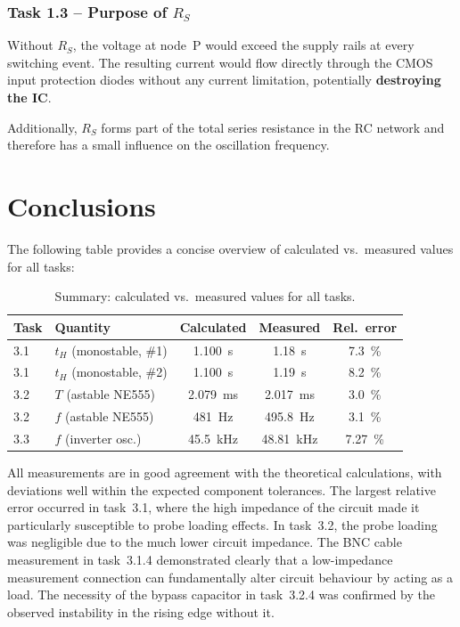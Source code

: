 \documentclass[12pt, a4paper]{article}
\begin{document}
\subsubsection{Task 1.3 -- Purpose of $R_S$}

Without $R_S$, the voltage at node~P would exceed the supply rails at every switching
event. The resulting current would flow directly through the CMOS input protection
diodes without any current limitation, potentially \textbf{destroying the IC}.

Additionally, $R_S$ forms part of the total series resistance in the RC network and
therefore has a small influence on the oscillation frequency.

\section{Conclusions}

The following table provides a concise overview of calculated vs.\ measured values
for all tasks:

\begin{table}[H]
  \centering
  \caption{Summary: calculated vs.\ measured values for all tasks.}
  \label{tab:summary}
  \begin{tabular}{llccc}
    \toprule
    Task & Quantity & Calculated & Measured & Rel.\ error \\
    \midrule
    3.1 & $t_H$ (monostable, \#1) & \SI{1.100}{\second}       & \SI{1.18}{\second}        & \SI{7.3}{\percent}  \\
    3.1 & $t_H$ (monostable, \#2) & \SI{1.100}{\second}       & \SI{1.19}{\second}        & \SI{8.2}{\percent}  \\
    3.2 & $T$ (astable NE555)     & \SI{2.079}{\milli\second} & \SI{2.017}{\milli\second} & \SI{3.0}{\percent}  \\
    3.2 & $f$ (astable NE555)     & \SI{481}{\hertz}          & \SI{495.8}{\hertz}        & \SI{3.1}{\percent}  \\
    3.3 & $f$ (inverter osc.)     & \SI{45.5}{\kilo\hertz}    & \SI{48.81}{\kilo\hertz}   & \SI{7.27}{\percent} \\
    \bottomrule
  \end{tabular}
\end{table}

All measurements are in good agreement with the theoretical calculations, with
deviations well within the expected component tolerances.
The largest relative error occurred in task~3.1, where the high impedance of the
circuit made it particularly susceptible to probe loading effects.
In task~3.2, the probe loading was negligible due to the much lower circuit impedance.
The BNC cable measurement in task~3.1.4 demonstrated clearly that a low-impedance
measurement connection can fundamentally alter circuit behaviour by acting as a load.
The necessity of the bypass capacitor in task~3.2.4 was confirmed by the observed
instability in the rising edge without it.
\end{document}
